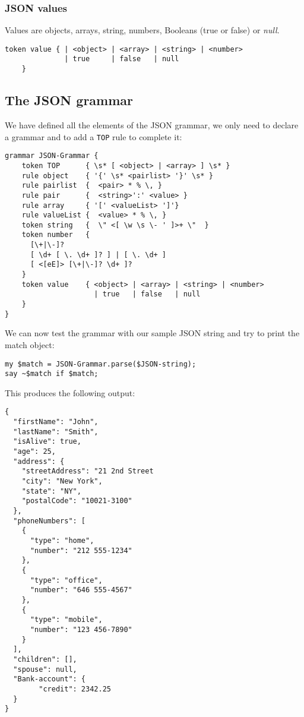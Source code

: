 \subsubsection{JSON values}

Values are objects, arrays, string, numbers, Booleans 
(true or false) or \emph{null}.

\begin{verbatim}
token value { | <object> | <array> | <string> | <number> 
              | true     | false   | null 
    }
\end{verbatim}

\subsection{The JSON grammar}

We have defined all the elements of the JSON grammar, we 
only need to declare a grammar and to add a {\tt TOP} rule 
to complete it:

\begin{verbatim}
grammar JSON-Grammar {
    token TOP      { \s* [ <object> | <array> ] \s* }
    rule object    { '{' \s* <pairlist> '}' \s* }
    rule pairlist  {  <pair> * % \, }
    rule pair      {  <string>':' <value> }
    rule array     { '[' <valueList> ']'}
    rule valueList {  <value> * % \, }
    token string   {  \" <[ \w \s \- ' ]>+ \"  }
    token number   { 
      [\+|\-]?  
      [ \d+ [ \. \d+ ]? ] | [ \. \d+ ]  
      [ <[eE]> [\+|\-]? \d+ ]?
    }
    token value    { <object> | <array> | <string> | <number> 
                     | true   | false   | null 
    }
}
\end{verbatim}

We can now test the grammar with our sample JSON string 
and try to print the match object:

\begin{verbatim}
my $match = JSON-Grammar.parse($JSON-string);
say ~$match if $match;
\end{verbatim}

This produces the following output:

\begin{verbatim}
{
  "firstName": "John",
  "lastName": "Smith",
  "isAlive": true,
  "age": 25,
  "address": {
    "streetAddress": "21 2nd Street
    "city": "New York",
    "state": "NY",
    "postalCode": "10021-3100"
  },
  "phoneNumbers": [
    {
      "type": "home",
      "number": "212 555-1234"
    },
    {
      "type": "office",
      "number": "646 555-4567"
    },
    {
      "type": "mobile",
      "number": "123 456-7890"
    }
  ],
  "children": [],
  "spouse": null,
  "Bank-account": {
        "credit": 2342.25
  }
}
\end{verbatim}

